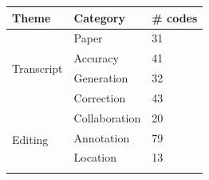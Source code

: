 \begin{table}[h]
\centering
{\small
\begin{tabular}{|l|l|l|} %
\hline
\textbf{Theme} & \textbf{Category} & \textbf{\# codes} \\ \hline
\multirow{4}{*}{Transcript}
& Paper & 31 \\ \cline{2-3}%
& Accuracy & 41 \\ \cline{2-3} %
& Generation & 32 \\ \cline{2-3} %
 & Correction & 43 \\ \hline %
\multirow{8}{*}{Editing}
& Collaboration & 20 \\ \cline{2-3} %
& Annotation & 79 \\ \cline{2-3} %
& Location & 13 \\ \cline{2-3} %

\end{tabular}}
\end{table}
